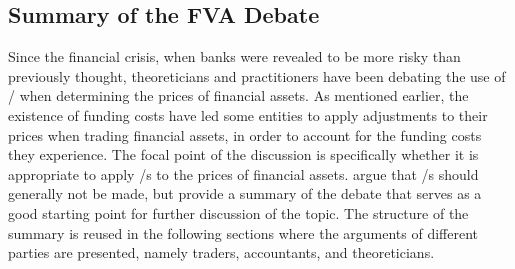 \documentclass[main.tex]{subfiles}
\begin{document}
    \subsection{Summary of the FVA Debate}
        Since the financial crisis, when banks were revealed to be more risky than previously thought,
        theoreticians and practitioners have been debating the use of \FVA/
        when determining the prices of financial assets.
        As mentioned earlier, the existence of funding costs have led some entities 
        to apply adjustments to their prices when trading financial assets, 
        in order to account for the funding costs they experience.
        The focal point of the discussion is specifically 
        whether it is appropriate to apply \FVA/s to the prices of financial assets.
        \textcite{HullWhiteFVA} argue that \FVA/s should generally not be made,
        but provide a summary of the debate that serves as a good starting point for further discussion of the topic.
        The structure of the summary is reused in the following sections
        where the arguments of different parties are presented,
        namely traders, accountants, and theoreticians.
\end{document}
